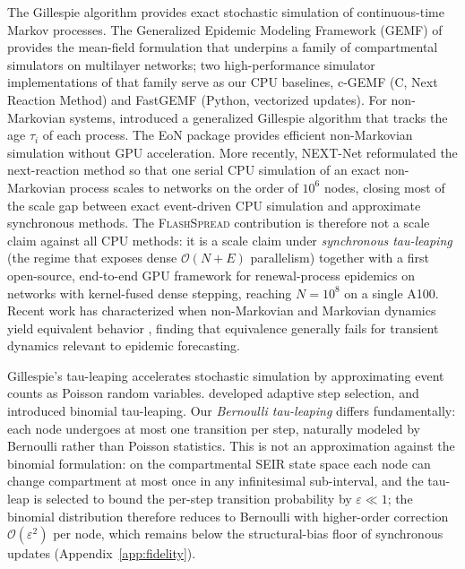 \documentclass[a4paper,fleqn]{cas-sc}
\theoremstyle{definition}
\theoremstyle{remark}
\newcommand{\flashspread}{\textsc{FlashSpread}}
\newcommand{\bigO}{\mathcal{O}}
\begin{document}
The Gillespie algorithm \citep{gillespie1977exact, gillespie1976general} provides exact stochastic simulation of continuous-time Markov processes. The Generalized Epidemic Modeling Framework (GEMF) of \citet{sahneh2013generalized} provides the mean-field formulation that underpins a family of compartmental simulators on multilayer networks; two high-performance simulator implementations of that family serve as our CPU baselines, c-GEMF \citep{sahneh2017gemfsim} (C, Next Reaction Method) and FastGEMF \citep{samaei2025fastgemf} (Python, vectorized updates). For non-Markovian systems, \citet{boguna2014simulating} introduced a generalized Gillespie algorithm that tracks the age $\tau_i$ of each process. The EoN package \citep{miller2020eon} provides efficient non-Markovian simulation without GPU acceleration. More recently, NEXT-Net \citep{cure2025fast} reformulated the next-reaction method so that one serial CPU simulation of an exact non-Markovian process scales to networks on the order of $10^6$ nodes, closing most of the scale gap between exact event-driven CPU simulation and approximate synchronous methods. The \flashspread{} contribution is therefore not a scale claim against all CPU methods: it is a scale claim under \emph{synchronous tau-leaping} (the regime that exposes dense $\bigO(N{+}E)$ parallelism) together with a first open-source, end-to-end GPU framework for renewal-process epidemics on networks with kernel-fused dense stepping, reaching $N = 10^8$ on a single A100. Recent work has characterized when non-Markovian and Markovian dynamics yield equivalent behavior \citep{feng2019equivalence, starnini2017equivalence}, finding that equivalence generally fails for transient dynamics relevant to epidemic forecasting.

Gillespie's tau-leaping \citep{gillespie2001approximate} accelerates stochastic simulation by approximating event counts as Poisson random variables. \citet{cao2006efficient} developed adaptive step selection, and \citet{chatterjee2005binomial} introduced binomial tau-leaping. Our \emph{Bernoulli tau-leaping} differs fundamentally: each node undergoes at most one transition per step, naturally modeled by Bernoulli rather than Poisson statistics. This is not an approximation against the binomial formulation: on the compartmental SEIR state space each node can change compartment at most once in any infinitesimal sub-interval, and the tau-leap is selected to bound the per-step transition probability by $\varepsilon \ll 1$; the binomial distribution therefore reduces to Bernoulli with higher-order correction $\bigO(\varepsilon^2)$ per node, which remains below the structural-bias floor of synchronous updates (Appendix~\ref{app:fidelity}).
\end{document}

